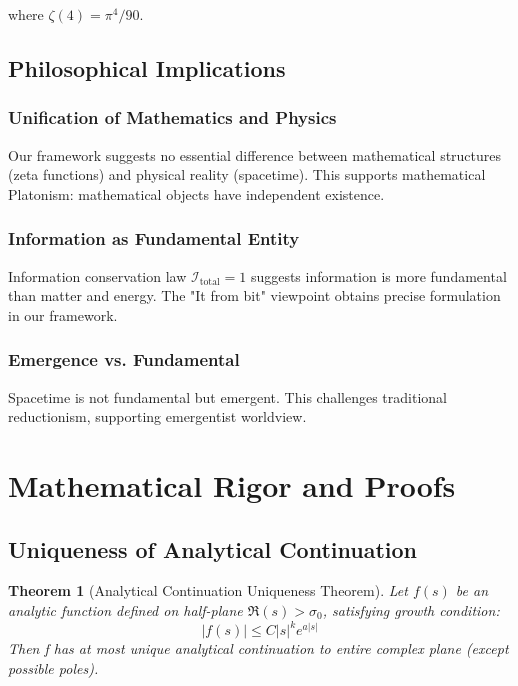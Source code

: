 \documentclass[12pt,a4paper]{article}
\newtheorem{theorem}{Theorem}[section]
\begin{document}
where $\zeta(4) = \pi^4/90$.

\subsection{Philosophical Implications}

\subsubsection{Unification of Mathematics and Physics}

Our framework suggests no essential difference between mathematical structures (zeta functions) and physical reality (spacetime). This supports mathematical Platonism: mathematical objects have independent existence.

\subsubsection{Information as Fundamental Entity}

Information conservation law $\mathcal{I}_{\text{total}} = 1$ suggests information is more fundamental than matter and energy. The "It from bit" viewpoint obtains precise formulation in our framework.

\subsubsection{Emergence vs. Fundamental}

Spacetime is not fundamental but emergent. This challenges traditional reductionism, supporting emergentist worldview.

\section{Mathematical Rigor and Proofs}

\subsection{Uniqueness of Analytical Continuation}

\begin{theorem}[Analytical Continuation Uniqueness Theorem]
Let $f(s)$ be an analytic function defined on half-plane $\Re(s) > \sigma_0$, satisfying growth condition:
$$|f(s)| \leq C|s|^k e^{a|s|}$$
Then f has at most unique analytical continuation to entire complex plane (except possible poles).
\end{theorem}
\end{document}
